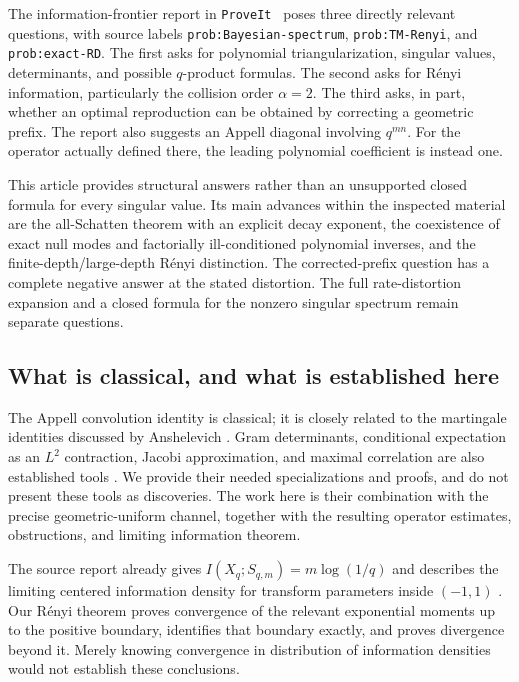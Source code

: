 \documentclass[11pt,a4paper]{article}
\numberwithin{equation}{section}
\theoremstyle{definition}\newtheorem{definition}[theorem]{Definition}
\theoremstyle{remark}\newtheorem{remark}[theorem]{Remark}
\newcommand{\repo}{\texttt{ProveIt}}
\begin{document}
The information-frontier report in \repo\ \cite{frontier,repo} poses three directly relevant questions, with source labels \texttt{prob:Bayesian-spectrum}, \texttt{prob:TM-Renyi}, and \texttt{prob:exact-RD}. The first asks for polynomial triangularization, singular values, determinants, and possible $q$-product formulas. The second asks for R\'enyi information, particularly the collision order $\alpha=2$. The third asks, in part, whether an optimal reproduction can be obtained by correcting a geometric prefix. The report also suggests an Appell diagonal involving $q^{mn}$. For the operator actually defined there, the leading polynomial coefficient is instead one.

This article provides structural answers rather than an unsupported closed formula for every singular value. Its main advances within the inspected material are the all-Schatten theorem with an explicit decay exponent, the coexistence of exact null modes and factorially ill-conditioned polynomial inverses, and the finite-depth/large-depth R\'enyi distinction. The corrected-prefix question has a complete negative answer at the stated distortion. The full rate-distortion expansion and a closed formula for the nonzero singular spectrum remain separate questions.

\subsection{What is classical, and what is established here}
The Appell convolution identity is classical; it is closely related to the martingale identities discussed by Anshelevich \cite{anshelevich}. Gram determinants, conditional expectation as an $L^2$ contraction, Jacobi approximation, and maximal correlation are also established tools \cite{dlmf,xu,anantharam}. We provide their needed specializations and proofs, and do not present these tools as discoveries. The work here is their combination with the precise geometric-uniform channel, together with the resulting operator estimates, obstructions, and limiting information theorem.

The source report already gives $I(X_q;S_{q,m})=m\log(1/q)$ and describes the limiting centered information density for transform parameters inside $(-1,1)$ \cite{frontier}. Our R\'enyi theorem proves convergence of the relevant exponential moments up to the positive boundary, identifies that boundary exactly, and proves divergence beyond it. Merely knowing convergence in distribution of information densities would not establish these conclusions.
\end{document}
